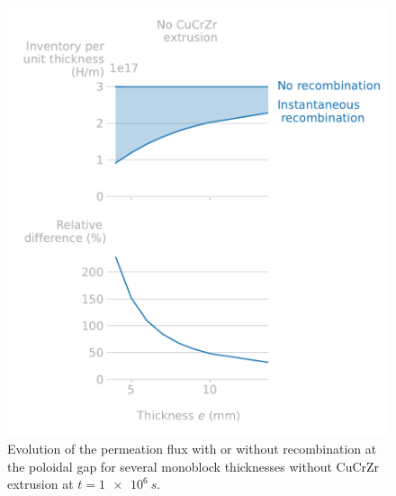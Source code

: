 \begin{figure} [h]
    \centering
    \includegraphics[width=\linewidth]{Figures/Chapter3/monoblocks/3D_monoblocks/inventory_vs_thickness_no_gap.pdf}
    \caption{Evolution of the permeation flux with or without recombination at the poloidal gap for several monoblock thicknesses without CuCrZr extrusion at $t=\SI{1e6}{s}$.}
    \label{fig: inventory monoblock vs thickness no gap}
\end{figure}

